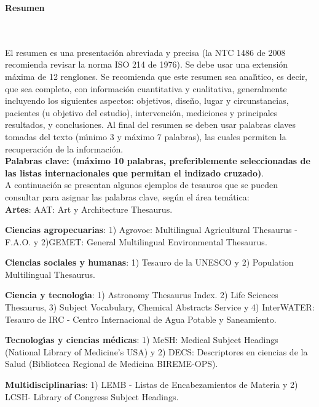 \newpage{\pagestyle{empty}\cleardoublepage}

\newpage
\textbf{\LARGE Resumen}
\\\\
El resumen es una presentaci\'{o}n abreviada y precisa (la NTC 1486 de 2008 recomienda revisar la norma ISO 214 de 1976). Se debe usar una extensi\'{o}n m\'{a}xima de 12 renglones. Se recomienda que este resumen sea anal\'{\i}tico, es decir, que sea completo, con informaci\'{o}n cuantitativa y cualitativa, generalmente incluyendo los siguientes aspectos: objetivos, dise\~{n}o, lugar y circunstancias, pacientes (u objetivo del estudio), intervenci\'{o}n, mediciones y principales resultados, y conclusiones. Al final del resumen se deben usar palabras claves tomadas del texto (m\'{\i}nimo 3 y m\'{a}ximo 7 palabras), las cuales permiten la recuperaci\'{o}n de la informaci\'{o}n.\\

\textbf{\small Palabras clave: (m\'{a}ximo 10 palabras, preferiblemente seleccionadas de las listas internacionales que permitan el indizado cruzado)}.\\

A continuaci\'{o}n se presentan algunos ejemplos de tesauros que se pueden consultar para asignar las palabras clave, seg\'{u}n el \'{a}rea tem\'{a}tica:\\

\textbf{Artes}: AAT: Art y Architecture Thesaurus.

\textbf{Ciencias agropecuarias}: 1) Agrovoc: Multilingual Agricultural Thesaurus - F.A.O. y 2)GEMET: General Multilingual Environmental Thesaurus.

\textbf{Ciencias sociales y humanas}: 1) Tesauro de la UNESCO y 2) Population Multilingual Thesaurus.

\textbf{Ciencia y tecnolog\'{\i}a}: 1) Astronomy Thesaurus Index. 2) Life Sciences Thesaurus, 3) Subject Vocabulary, Chemical Abstracts Service y 4) InterWATER: Tesauro de IRC - Centro Internacional de Agua Potable y Saneamiento.

\textbf{Tecnolog\'{\i}as y ciencias m\'{e}dicas}: 1) MeSH: Medical Subject Headings (National Library of Medicine's USA) y 2) DECS: Descriptores en ciencias de la Salud (Biblioteca Regional de Medicina BIREME-OPS).

\textbf{Multidisciplinarias}: 1) LEMB - Listas de Encabezamientos de Materia y 2) LCSH- Library of Congress Subject Headings.\\

